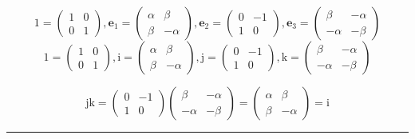 \documentclass[
]{book}
\theoremstyle{definition}
\theoremstyle{definition}
\theoremstyle{definition}
\theoremstyle{definition}
\theoremstyle{remark}
\begin{document}
\[
1=\begin{pmatrix}1 & 0\\
0 & 1
\end{pmatrix},\boldsymbol{e}_{{\scriptscriptstyle 1}}=\begin{pmatrix}\alpha & \beta\\
\beta & -\alpha
\end{pmatrix},\boldsymbol{e}_{{\scriptscriptstyle 2}}=\begin{pmatrix}0 & -1\\
1 & 0
\end{pmatrix},\boldsymbol{e}_{{\scriptscriptstyle 3}}=\begin{pmatrix}\beta & -\alpha\\
-\alpha & -\beta
\end{pmatrix}
\]
\[
1=\begin{pmatrix}1 & 0\\
0 & 1
\end{pmatrix},\mathrm{i}=\begin{pmatrix}\alpha & \beta\\
\beta & -\alpha
\end{pmatrix},\mathrm{j}=\begin{pmatrix}0 & -1\\
1 & 0
\end{pmatrix},\mathrm{k}=\begin{pmatrix}\beta & -\alpha\\
-\alpha & -\beta
\end{pmatrix}
\]

\[
\mathrm{j}\mathrm{k}=\begin{pmatrix}0 & -1\\
1 & 0
\end{pmatrix}\begin{pmatrix}\beta & -\alpha\\
-\alpha & -\beta
\end{pmatrix}=\begin{pmatrix}\alpha & \beta\\
\beta & -\alpha
\end{pmatrix}=\mathrm{i}
\]

\begin{center}\rule{0.5\linewidth}{0.5pt}\end{center}
\end{document}
